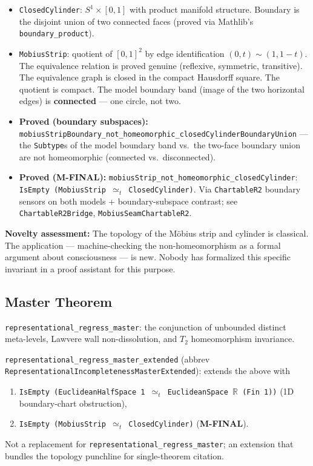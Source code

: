 \documentclass[11pt]{article}
\begin{document}
\begin{itemize}
\item \texttt{ClosedCylinder}: $S^1 \times [0,1]$ with product manifold structure.
  Boundary is the disjoint union of two connected faces (proved via Mathlib's
  \texttt{boundary\_product}).
\item \texttt{MobiusStrip}: quotient of $[0,1]^2$ by edge identification $(0,t) \sim (1,1-t)$.
  The equivalence relation is proved genuine (reflexive, symmetric, transitive).
  The equivalence graph is closed in the compact Hausdorff square. The quotient
  is compact. The model boundary band (image of the two horizontal edges) is
  \textbf{connected} --- one circle, not two.
\item \textbf{Proved (boundary subspaces):} \texttt{mobiusStripBoundary\_not\_homeomorphic\_closedCylinderBoundaryUnion} --- the \texttt{Subtype}s of the model boundary band vs.\ the two-face boundary union are not homeomorphic (connected vs.\ disconnected).
\item \textbf{Proved (M-FINAL):} \texttt{mobiusStrip\_not\_homeomorphic\_closedCylinder}: \texttt{IsEmpty (MobiusStrip $\simeq_t$ ClosedCylinder)}. Via \texttt{ChartableR2} boundary sensors on both models + boundary-subspace contrast; see \texttt{ChartableR2Bridge}, \texttt{MobiusSeamChartableR2}.
\end{itemize}

\textbf{Novelty assessment:} The topology of the M\"obius strip and cylinder is
classical. The application --- machine-checking the non-homeomorphism as a formal
argument about consciousness --- is new. Nobody has formalized this specific
invariant in a proof assistant for this purpose.

\subsection{Master Theorem}

\texttt{representational\_regress\_master}: the conjunction of unbounded distinct meta-levels, Lawvere wall non-dissolution, and $T_2$ homeomorphism invariance.

\texttt{representational\_regress\_master\_extended} (abbrev \texttt{RepresentationalIncompletenessMasterExtended}): extends the above with
\begin{enumerate}
\item \texttt{IsEmpty (EuclideanHalfSpace 1 $\simeq_t$ EuclideanSpace $\mathbb{R}$ (Fin 1))} (1D boundary-chart obstruction),
\item \texttt{IsEmpty (MobiusStrip $\simeq_t$ ClosedCylinder)} (\textbf{M-FINAL}).
\end{enumerate}
\noindent Not a replacement for \texttt{representational\_regress\_master}; an extension that bundles the topology punchline for single-theorem citation.
\end{document}
